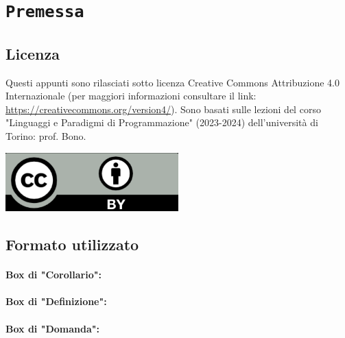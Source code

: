 \chapter*{\centering \texttt{Premessa}}

\section*{Licenza}

Questi appunti sono rilasciati sotto licenza Creative Commons Attribuzione 4.0 Internazionale (per maggiori
informazioni consultare il link: \href{https://creativecommons.org/version4/}{https://creativecommons.org/version4/}). Sono basati sulle lezioni del corso "Linguaggi e Paradigmi di Programmazione" (2023-2024) dell'università di Torino: prof. Bono.
\begin{center}
    \includegraphics[width=0.5\textwidth]{images/cc.png}
\end{center}

\section*{Formato utilizzato}

\subsubsection{Box di "Corollario":}


\subsubsection{Box di "Definizione":}


\subsubsection{Box di "Domanda":}


